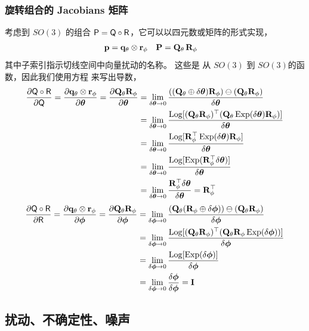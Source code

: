 \subsubsection{旋转组合的 Jacobians 矩阵}

考虑到 $SO(3)$ 的组合 $\mathsf P=\mathsf Q\circ\mathsf R$，它可以以四元数或矩阵的形式实现，
%
\begin{align*}
{\bf p} &= {\bf q}_\theta\otimes{\bf r}_\phi & {\bf P} &= {\bf Q}_\theta\,{\bf R}_\phi
\end{align*}
%
其中子索引指示切线空间中向量扰动的名称。 
这些是 从 $SO(3)$ 到 $SO(3)$的函数，因此我们使用方程  来写出导数，
%
\begin{align*}
\frac{\partial\mathsf Q\circ\mathsf R}{\partial\mathsf Q} 
= \frac{\partial{\bf q}_\theta\otimes{\bf r}_\phi}{\partial{\bm \theta}} 
= \frac{\partial{\bf Q}_\theta {\bf R}_\phi}{\partial{\bm \theta}} 
&= \lim_{\delta{\bm \theta}\to 0}\frac{(({\bf Q}_\theta\oplus\delta{\bm \theta}){\bf R}_\phi)\ominus({\bf Q}_\theta{\bf R}_\phi)}{\delta{\bm \theta}} \\
&= \lim_{\delta{\bm \theta}\to 0}\frac{\operatorname*{Log}[({\bf Q}_\theta{\bf R}_\phi)^{\top}({\bf Q}_\theta\operatorname*{Exp}(\delta{\bm \theta}){\bf R}_\phi)]}{\delta{\bm \theta}} \\
&= \lim_{\delta{\bm \theta}\to 0}\frac{\operatorname*{Log}[{\bf R}_\phi^{\top}\operatorname*{Exp}(\delta{\bm \theta}){\bf R}_\phi]}{\delta{\bm \theta}} \\
&= \lim_{\delta{\bm \theta}\to 0}\frac{\operatorname*{Log}[\operatorname*{Exp}({\bf R}_\phi^{\top}\delta{\bm \theta})]}{\delta{\bm \theta}} \\
&= \lim_{\delta{\bm \theta}\to 0}\frac{{\bf R}_\phi^{\top}\delta{\bm \theta}}{\delta{\bm \theta}}  = {\bf R}_\phi^{\top} 
\end{align*}
%
\begin{align*}
\frac{\partial\mathsf Q\circ\mathsf R}{\partial\mathsf R} 
= \frac{\partial{\bf q}_\theta\otimes{\bf r}_\phi}{\partial{\bm \phi}} 
= \frac{\partial{\bf Q}_\theta {\bf R}_\phi}{\partial{\bm \phi}} 
&= \lim_{\delta{\bm \phi}\to 0}\frac{({\bf Q}_\theta({\bf R}_\phi\oplus\delta{\bm \phi}))\ominus({\bf Q}_\theta{\bf R}_\phi)}{\delta{\bm \phi}} \\
&= \lim_{\delta{\bm \phi}\to 0}\frac{\operatorname*{Log}[({\bf Q}_\theta{\bf R}_\phi)^{\top}({\bf Q}_\theta{\bf R}_\phi\operatorname*{Exp}(\delta{\bm \phi}))]}{\delta{\bm \phi}} \\
&= \lim_{\delta{\bm \phi}\to 0}\frac{\operatorname*{Log}[\operatorname*{Exp}(\delta{\bm \phi})]}{\delta{\bm \phi}} \\
&= \lim_{\delta{\bm \phi}\to 0}\frac{\delta{\bm \phi}}{\delta{\bm \phi}}  = {\bf I} 
\end{align*}

\subsection{扰动、不确定性、噪声}

